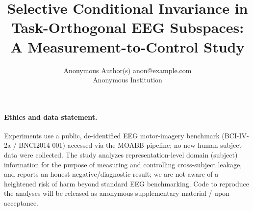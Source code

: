 \documentclass[10pt]{article} %
\title{Selective Conditional Invariance in Task-Orthogonal EEG Subspaces:\\
A Measurement-to-Control Study}
\author{\name Anonymous Author(s) \email anon@example.com \\
      \addr Anonymous Institution}
\begin{document}
\maketitle

















\paragraph{Ethics and data statement.}
Experiments use a public, de-identified EEG motor-imagery benchmark (BCI-IV-2a / BNCI2014-001) accessed via
the MOABB pipeline; no new human-subject data were collected. The study analyzes representation-level domain
(subject) information for the purpose of measuring and controlling cross-subject leakage, and reports an
honest negative/diagnostic result; we are not aware of a heightened risk of harm beyond standard EEG
benchmarking. Code to reproduce the analyses will be released as anonymous supplementary material / upon
acceptance.





\end{document}
